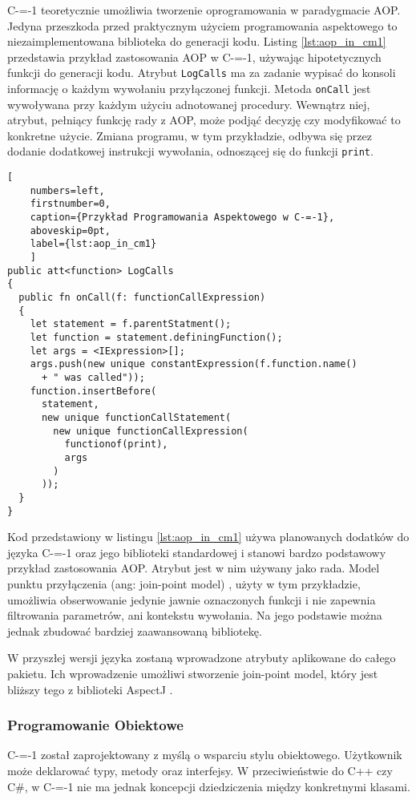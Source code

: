 C-=-1 teoretycznie umożliwia tworzenie oprogramowania w paradygmacie AOP.
Jedyna przeszkoda przed praktycznym użyciem programowania aspektowego to niezaimplementowana biblioteka do generacji kodu.
Listing \ref{lst:aop_in_cm1} przedstawia przykład zastosowania AOP w C-=-1, używając hipotetycznych funkcji do generacji kodu.
Atrybut \lstinline{LogCalls} ma za zadanie wypisać do konsoli informację o każdym wywołaniu przyłączonej funkcji.
Metoda \lstinline{onCall} jest wywoływana przy każdym użyciu adnotowanej procedury.
Wewnątrz niej, atrybut, pełniący funkcję rady z AOP, może podjąć decyzję czy modyfikować to konkretne użycie.
Zmiana programu, w tym przykładzie, odbywa się przez dodanie dodatkowej instrukcji wywołania, odnoszącej się do funkcji \lstinline{print}.

\begin{minipage}{\linewidth}
  
  \begin{lstlisting}[
    numbers=left,
    firstnumber=0,
    caption={Przykład Programowania Aspektowego w C-=-1},
    aboveskip=0pt,
    label={lst:aop_in_cm1}
    ]
public att<function> LogCalls
{
  public fn onCall(f: functionCallExpression)
  {
    let statement = f.parentStatment();
    let function = statement.definingFunction();
    let args = <IExpression>[];
    args.push(new unique constantExpression(f.function.name()
      + " was called"));
    function.insertBefore(
      statement,
      new unique functionCallStatement(
        new unique functionCallExpression(
          functionof(print),
          args
        )
      ));
  }
}
\end{lstlisting}
\end{minipage}

Kod przedstawiony w listingu \ref{lst:aop_in_cm1} używa planowanych dodatków do języka C-=-1 oraz jego biblioteki standardowej i stanowi bardzo podstawowy przykład zastosowania AOP.
Atrybut jest w nim używany jako rada.
Model punktu przyłączenia (ang: join-point model) \cite{vidal2019jpiaspectz}, użyty w tym przykładzie, umożliwia obserwowanie jedynie jawnie oznaczonych funkcji i nie zapewnia filtrowania parametrów, ani kontekstu wywołania.
Na jego podstawie można jednak zbudować bardziej zaawansowaną bibliotekę.

W przyszłej wersji języka zostaną wprowadzone atrybuty aplikowane do całego pakietu.
Ich wprowadzenie umożliwi stworzenie join-point model, który jest bliższy tego z biblioteki AspectJ \cite{keselev2003aspect}.


\subsubsection{Programowanie Obiektowe}
C-=-1 został zaprojektowany z myślą o wsparciu stylu obiektowego. Użytkownik może deklarować typy, metody oraz interfejsy. W przeciwieństwie do C++ czy C\#, w C-=-1 nie ma jednak koncepcji dziedziczenia między konkretnymi klasami.

